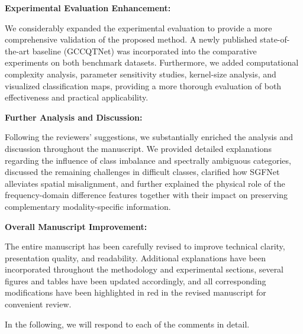 \textbf{Experimental Evaluation Enhancement:}

We considerably expanded the experimental evaluation to provide a more comprehensive validation of the proposed method. A newly published state-of-the-art baseline (GCCQTNet) was incorporated into the comparative experiments on both benchmark datasets. Furthermore, we added computational complexity analysis, parameter sensitivity studies, kernel-size analysis, and visualized classification maps, providing a more thorough evaluation of both effectiveness and practical applicability.

\textbf{Further Analysis and Discussion:}

Following the reviewers' suggestions, we substantially enriched the analysis and discussion throughout the manuscript. We provided detailed explanations regarding the influence of class imbalance and spectrally ambiguous categories, discussed the remaining challenges in difficult classes, clarified how SGFNet alleviates spatial misalignment, and further explained the physical role of the frequency-domain difference features together with their impact on preserving complementary modality-specific information.

\textbf{Overall Manuscript Improvement:}

The entire manuscript has been carefully revised to improve technical clarity, presentation quality, and readability. Additional explanations have been incorporated throughout the methodology and experimental sections, several figures and tables have been updated accordingly, and all corresponding modifications have been highlighted in red in the revised manuscript for convenient review.

In the following, we will respond to each of the comments in detail.
